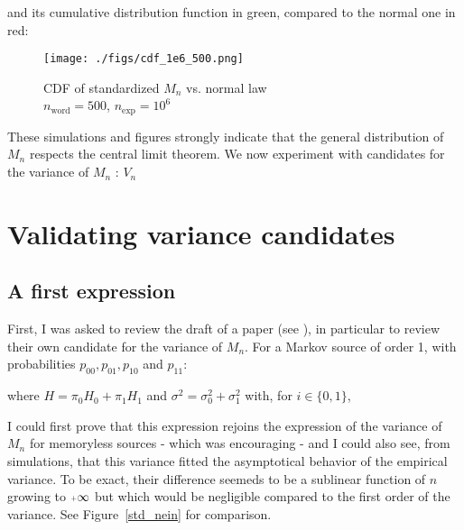 	\noindent
	 and its cumulative distribution function in green, compared to the normal one in red:
 	
	  \begin{figure}[H]
		\centering
        \texttt{[image: ./figs/cdf\_1e6\_500.png]}
		\caption{CDF of standardized $M_n$ vs. normal law\\
				$n_{\text{word}} = 500$, $n_{\text{exp}} = 10^6$}
	  \end{figure} 
	
	
	These simulations and figures strongly indicate that the general distribution
	of $M_n$ respects the central limit theorem. We now experiment with
	candidates for the variance of $M_n$ : $V_n$


	
	
	\section{Validating variance candidates}
	\subsection{A first expression}

	First, I was asked to review the draft of a paper (see \cite{leckey_probabilistic_2018}),
	in particular to review their own candidate for the variance of $M_n$. 
	For a Markov source of order 1, with probabilities 
	$p_{0 0}, p_{0 1}, p_{1 0}$ and $p_{1 1}$:

		
	where $H = \pi_0 H_0 + \pi_1 H_1 $ and $\sigma^2 = \sigma_0^2 + \sigma_1^2$ with, for $i\in\{0,1\}$,
	
	I could first prove that this expression rejoins the expression of 
	the variance of $M_n$ for memoryless sources - which was encouraging -
	and I could also see, from simulations, that this variance fitted the 
	asymptotical behavior of the empirical variance. To be exact, 
	their difference seemeds to be a sublinear function of $n$ growing
	to $\pinf$ but which would be negligible compared to the first 
	order of the variance. See Figure~\ref{std_nein} for comparison.
	
